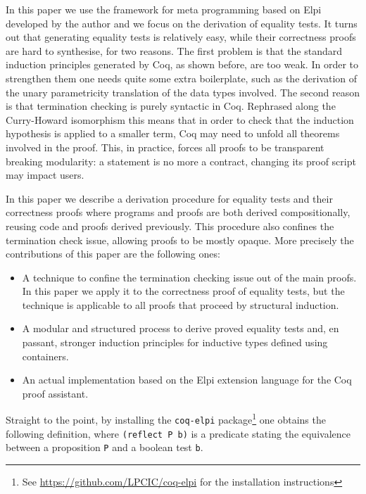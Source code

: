 \documentclass[sigplan,10pt,review]{acmart}\settopmatter{printfolios=true,printccs=false,printacmref=false}
\begin{document}
In this paper we use the framework for meta programming based on
Elpi~\cite{dunchev:hal-01176856,tassi:hal-01637063} developed by the
author and we focus on the derivation of equality tests.
It turns out that generating equality tests is relatively easy,
while their correctness proofs are hard to synthesise, for two reasons. 
The first problem is that 
the standard induction principles generated by Coq, as shown
before, are too weak. In order to strengthen them one needs quite some extra
boilerplate, such as the derivation of the unary parametricity
translation of the data types involved.
The second reason is that termination checking
is purely syntactic in Coq. Rephrased along the Curry-Howard
isomorphism this means that in order to check that the induction
hypothesis is applied to a smaller term, Coq may need to unfold all
theorems involved in the proof. This, in practice, forces all proofs to
be transparent breaking modularity: a statement is no more a contract,
changing its proof script may impact users.

In this paper we describe a derivation procedure for equality tests
and their correctness proofs
where programs and proofs are both
derived compositionally, reusing code and proofs derived previously.
This procedure also confines the termination check issue,
allowing proofs to be mostly opaque.
More precisely the contributions of this paper are the following ones:
\begin{itemize}
\item A technique to confine the termination checking issue out of the
	main proofs. In this paper we apply it to the correctness
	proof of equality
	tests, but the technique is applicable to all proofs 
	that proceed by structural
	induction.

\item A modular and structured process to derive proved equality tests
		and, en passant, stronger
	induction principles for inductive types defined using
	containers.

\item An actual implementation based on the Elpi extension language
	for the Coq proof assistant.
\end{itemize}

\noindent
Straight to the point, by installing the \lstinline+coq-elpi+
package\footnote{See \url{https://github.com/LPCIC/coq-elpi} for the
installation instructions} 
one obtains the following definition, where \lstinline+(reflect P b)+
is a predicate stating the equivalence between a proposition
\lstinline+P+ and a boolean test \lstinline+b+.
\end{document}
